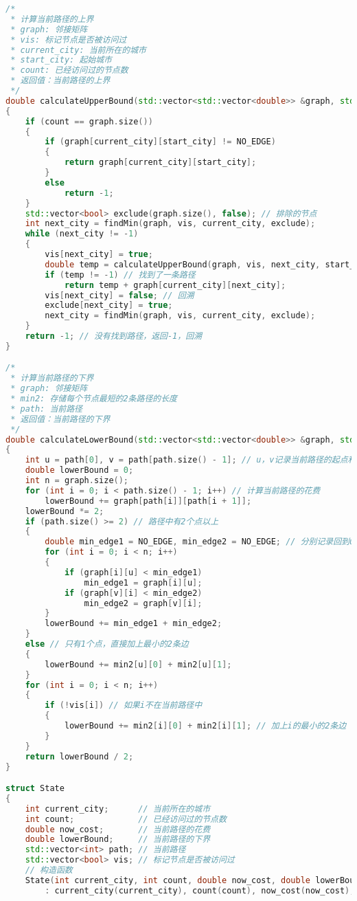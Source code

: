 \documentclass[lang=cn,11pt,a4paper]{elegantpaper}
\begin{document}
\begin{lstlisting}[language=c++]
/*
 * 计算当前路径的上界
 * graph: 邻接矩阵
 * vis: 标记节点是否被访问过
 * current_city: 当前所在的城市
 * start_city: 起始城市
 * count: 已经访问过的节点数
 * 返回值：当前路径的上界
 */
double calculateUpperBound(std::vector<std::vector<double>> &graph, std::vector<bool> &vis, int current_city, int start_city, int count)
{
    if (count == graph.size())
    {
        if (graph[current_city][start_city] != NO_EDGE)
        {
            return graph[current_city][start_city];
        }
        else
            return -1;
    }
    std::vector<bool> exclude(graph.size(), false); // 排除的节点
    int next_city = findMin(graph, vis, current_city, exclude);
    while (next_city != -1)
    {
        vis[next_city] = true;
        double temp = calculateUpperBound(graph, vis, next_city, start_city, count + 1);
        if (temp != -1) // 找到了一条路径
            return temp + graph[current_city][next_city];
        vis[next_city] = false; // 回溯
        exclude[next_city] = true;
        next_city = findMin(graph, vis, current_city, exclude);
    }
    return -1; // 没有找到路径，返回-1，回溯
}

/*
 * 计算当前路径的下界
 * graph: 邻接矩阵
 * min2: 存储每个节点最短的2条路径的长度
 * path: 当前路径
 * 返回值：当前路径的下界
 */
double calculateLowerBound(std::vector<std::vector<double>> &graph, std::vector<std::vector<double>> &min2, std::vector<int> &path, std::vector<bool> &vis)
{
    int u = path[0], v = path[path.size() - 1]; // u，v记录当前路径的起点和终点
    double lowerBound = 0;
    int n = graph.size();
    for (int i = 0; i < path.size() - 1; i++) // 计算当前路径的花费
        lowerBound += graph[path[i]][path[i + 1]];
    lowerBound *= 2;
    if (path.size() >= 2) // 路径中有2个点以上
    {
        double min_edge1 = NO_EDGE, min_edge2 = NO_EDGE; // 分别记录回到u的最小边和从v出发的最小边
        for (int i = 0; i < n; i++)
        {
            if (graph[i][u] < min_edge1) 
                min_edge1 = graph[i][u];
            if (graph[v][i] < min_edge2)
                min_edge2 = graph[v][i];
        }
        lowerBound += min_edge1 + min_edge2;
    }
    else // 只有1个点，直接加上最小的2条边
    {
        lowerBound += min2[u][0] + min2[u][1];
    }
    for (int i = 0; i < n; i++)
    {
        if (!vis[i]) // 如果i不在当前路径中
        {
            lowerBound += min2[i][0] + min2[i][1]; // 加上i的最小的2条边
        }
    }
    return lowerBound / 2;
}

struct State
{
    int current_city;      // 当前所在的城市
    int count;             // 已经访问过的节点数
    double now_cost;       // 当前路径的花费
    double lowerBound;     // 当前路径的下界
    std::vector<int> path; // 当前路径
    std::vector<bool> vis; // 标记节点是否被访问过
    // 构造函数
    State(int current_city, int count, double now_cost, double lowerBound, std::vector<int> &path, std::vector<bool> &vis)
        : current_city(current_city), count(count), now_cost(now_cost), lowerBound(lowerBound), path(path), vis(vis) {}


\end{lstlisting}
\end{document}
